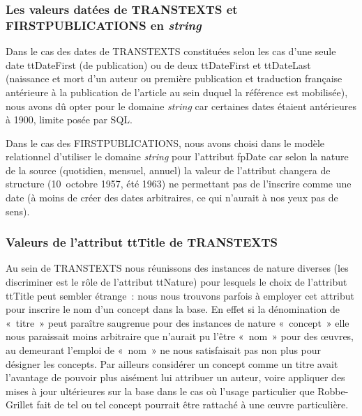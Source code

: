 \documentclass[12pt, a4paper]{article}
\begin{document}
\subsubsection{Les valeurs datées de TRANSTEXTS et FIRSTPUBLICATIONS en \textit{string}}
Dans le cas des dates de TRANSTEXTS constituées selon les cas d'une seule date ttDateFirst (de publication) ou de deux ttDateFirst et ttDateLast (naissance et mort d'un auteur ou première publication et traduction française antérieure à la publication de l'article au sein duquel la référence est mobilisée), nous avons dû opter pour le domaine \textit{string} car certaines dates étaient antérieures à 1900, limite posée par SQL.

Dans le cas des FIRSTPUBLICATIONS, nous avons choisi dans le modèle relationnel d'utiliser le domaine \textit{string} pour l'attribut fpDate car selon la nature de la source (quotidien, mensuel, annuel) la valeur de l'attribut changera de structure (10~octobre 1957, été 1963) ne permettant pas de l'inscrire comme une date (à moins de créer des dates arbitraires, ce qui n'aurait à nos yeux pas de sens).


\subsubsection{Valeurs de l'attribut ttTitle de TRANSTEXTS}

Au sein de TRANSTEXTS nous réunissons des instances de nature diverses (les discriminer est le rôle de l'attribut ttNature) pour lesquels le choix de l'attribut ttTitle peut sembler étrange~: nous nous trouvons parfois à employer cet attribut pour inscrire le nom d'un concept dans la base. En effet si la dénomination de «~titre~» peut paraître saugrenue pour des instances de nature «~concept~» elle nous paraissait moins arbitraire que n'aurait pu l'être «~nom~» pour des œuvres, au demeurant l'emploi de «~nom~» ne nous satisfaisait pas non plus pour désigner les concepts. Par ailleurs considérer un concept comme un titre avait l'avantage de pouvoir plus aisément lui attribuer un auteur, voire appliquer des mises à jour ultérieures sur la base dans le cas où l'usage particulier que Robbe-Grillet fait de tel ou tel concept pourrait être rattaché à une œuvre particulière.
\end{document}
